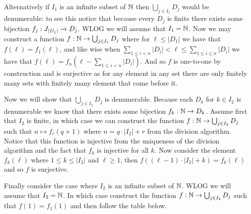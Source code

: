 \documentclass[12pt]{amsart}
\begin{document}
\begin{enumerate}
          Alternatively if $I_1$ is an infinite subset of $\mathbb{N}$ then $\bigcup_{j\in
                  I_1}D_j$ would be denumerable: to see this notice that because every $D_j$ is
          finite there exists some bijection $f_j:J_{|D_j|}\rightarrow D_j$. WLOG we will assume
          that $I_1=\mathbb{N}$. Now we may construct a function $f:\mathbb{N}\rightarrow \bigcup_{j\in I_1}D_j$
          where for $\ell\leq |D_{1}|$ we have that $f(\ell)=f_{1}(\ell)$, and like wise
          when $\sum_{1\leq i <n}|D_{i}|<\ell\leq \sum_{1\leq i \leq n}|D_{i}|$ we have
          that $f(\ell)=f_n(\ell-\sum_{1\leq i <n}|D_{i}|)$. And so $f$ is one-to-one by
          construction and is surjective as for any element in any set there are only
          finitely many sets with finitely many element that come before it.


          Now we will show that $\bigcup_{j\in I_2}D_j$ is denumerable. Because each
          $D_k$ for $k\in I_2$ is denumerable we know that there exists some bijection
          $f_k:\mathbb{N}\rightarrow D_k$. Assume first that $I_2$ is finite, in which case we can
          construct the function $f:\mathbb{N}\rightarrow \bigcup_{j\in I_2}D_j$ such that $n\mapsto
              f_{r}(q+1)$ where $n=q\cdot |I_2|+r$ from the division algorithm. Notice that
          this function is injective from the uniqueness of the division algorithm and
          the fact that $f_k$ is injective for all $k$. Now consider the element
          $f_k(\ell)$ where $1\leq k\leq |I_2|$ and $\ell\geq 1$, then $f((\ell-1)\cdot
              |I_2|+k)=f_k(\ell)$ and so $f$ is surjective.


          Finally consider the case where $I_2$ is an infinite subset of $\mathbb{N}$. WLOG we
          will assume that $I_2=\mathbb{N}$. In which case construct the function $f:\mathbb{N}\rightarrow
              \bigcup_{j\in I_2}D_j$ such that $f(1)=f_1(1)$ and then follow the table below.


\end{enumerate}
\end{document}
